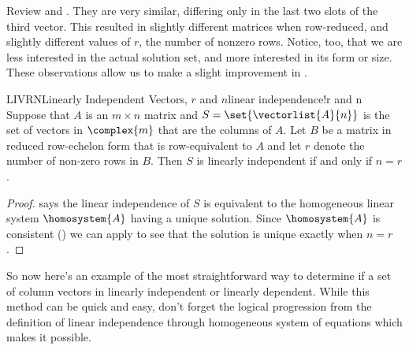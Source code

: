 Review  and .  They are very similar, differing only in the last two slots of the third vector.  This resulted in slightly different matrices when row-reduced, and slightly different values of $r$, the number of nonzero rows.  Notice, too, that we are less interested in the actual solution set, and more interested in its form or size.  These observations allow us to make a slight improvement in .
%
\begin{theorem}{LIVRN}{Linearly Independent Vectors, $r$ and $n$}{linear independence!r and n}
Suppose that $A$ is an $m\times n$ matrix and $S=\set{\vectorlist{A}{n}}$ is the set of vectors in $\complex{m}$ that are the columns of $A$.   Let $B$ be a matrix in reduced row-echelon form that is row-equivalent to $A$ and let $r$ denote the number of non-zero rows in $B$.  Then $S$ is linearly independent if and only if $n=r$.
\end{theorem}
%
\begin{proof}
 says the linear independence of $S$ is equivalent to the homogeneous linear system $\homosystem{A}$ having a unique solution.  Since $\homosystem{A}$ is consistent () we can apply  to see that the solution is unique exactly when $n=r$.
\end{proof}
%
So now here's an example of the most straightforward way to determine if a set of column vectors in linearly independent or linearly dependent.  While this method can be quick and easy, don't forget the logical progression from the definition of linear independence through homogeneous system of equations which makes it possible.
%
